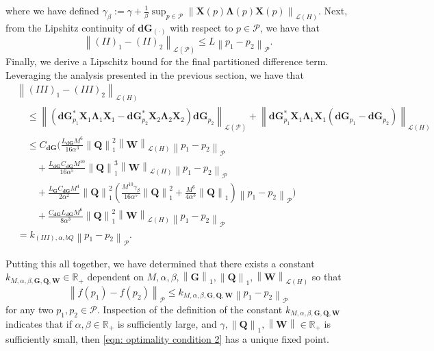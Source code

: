 \documentclass{amsart}
\newcommand{\sL}{\mathscr L}
\newcommand{\p}[1]{\left( {#1} \right)}
\newcommand{\norm}[1]{\left\| #1 \right\|}
\newcommand{\sP}{\mathcal{P}}
\newcommand{\bX}{\mathbf X}
\newcommand{\bQ}{\mathbf Q}
\newcommand{\bG}{\mathbf G}
\newcommand{\bLambda}{\boldsymbol{\Lambda}}
\newcommand{\bd}{\mathbf d}
\newcommand{\bW}{\mathbf W}
\begin{document}
where we have defined $\gamma_\beta:= \gamma + \frac{1}{\beta} \sup_{p\in\sP}\norm{\bX(p)\bLambda(p)\bX(p)}_{\sL\p{H}}$. 
Next, from the Lipshitz continuity of $\bd\bG_{(\cdot)}$ with respect to $p \in \sP$, we have that
$$
    \norm{(II)_1-(II)_2}_{\sL\p{\sP}} \leq 
    L \norm{p_1 - p_2}_{\sP}.
$$
Finally, we derive a Lipschitz bound for the final partitioned difference term. Leveraging the analysis presented in the previous section, we have that
$$
\begin{aligned}
    &\norm{(III)_1 - (III)_2}_{\sL\p{H}}\\ &\quad\leq 
    \norm{\p{\bd\bG_{p_1}^*\bX_1\bLambda_1\bX_1 - \bd\bG_{p_2}^*\bX_2\bLambda_2\bX_2}\bd\bG_{p_2}}_{\sL\p{\sP}} + \norm{\bd\bG_{p_1}^*\bX_1\bLambda_1\bX_1\p{\bd\bG_{p_1}-\bd\bG_{p_2}}}_{\sL\p{H}} \\
    &\quad\leq C_{\bd\bG}\bigg(
         \frac{L_{\bd\bG}M^6}{16\alpha^3}
        \norm{\bQ}_1^2\norm{\bW}_{\sL(H)}
        \norm{p_1 - p_2}_\sP\\
         &\qquad + \frac{L_{\bd\bG}C_{\bd\bG}M^{10}}{16\alpha^5}\norm{\bQ}_1^3 \norm{\bW}_{\sL(H)}\norm{p_1 - p_2}_\sP \\
         &\qquad + 
         \frac{L_{\bG}C_{\bd\bG}M^4}{2\alpha^2}\norm{\bQ}_1^2 
          \p{\frac{M^{10}\gamma_\beta}{16\alpha^5}\norm{\bQ}^2_1 
        + \frac{M^6}{4\alpha^3}\norm{\bQ}_1 }
        \norm{p_1 - p_2}_\sP\bigg) \\
        &\qquad +
        \frac{C_{\bd\bG}L_{\bd\bG}M^6}{8\alpha^3}\norm{\bQ}_1^2 \norm{\bW}_{\sL\p{H}}\norm{p_1 - p_2}_\sP \\
        &= k_{(III), \alpha, bQ}\norm{p_1 - p_2}_{\sP} .
\end{aligned}
$$

Putting this all together, we have determined that there exists a constant $k_{M,\alpha, \beta, \bG,\bQ,\bW} \in \mathbb R_+$ dependent on $M, \alpha, \beta, \norm{\bG}_1, \norm{\bQ}_1, \norm{\bW}_{\sL(H)}$ so that
$$
    \norm{f(p_1) - f(p_2)}_{\sP} \leq k_{M, \alpha, \beta, \bG, \bQ, \bW} \norm{p_1 - p_2}_{\sP}
$$
for any two $p_1, p_2 \in \sP$. Inspection of the definition of the constant $k_{M, \alpha, \beta, \bG, \bQ, \bW}$ indicates that if $\alpha, \beta\in \mathbb R_+$ is sufficiently large, and $\gamma,\norm{\bQ}_1, \norm{\bW} \in \mathbb R_+$ is sufficiently small, then \eqref{eqn: optimality condition 2} has a unique fixed point. 
\end{document}
